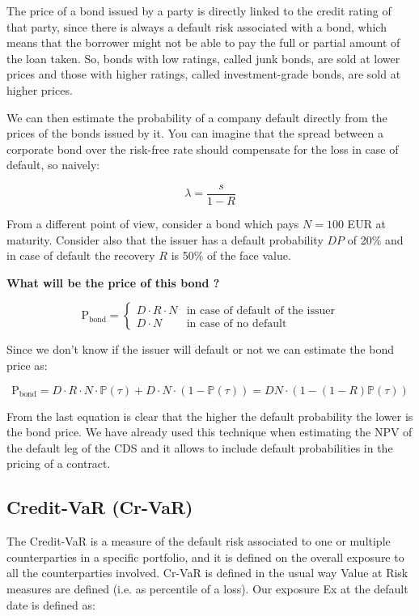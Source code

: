 The price of a bond issued by a party is directly linked to the credit
rating of that party, since there is always a default risk associated
with a bond, which means that the borrower might not be able to pay the
full or partial amount of the loan taken. So, bonds with low ratings,
called junk bonds, are sold at lower prices and those with higher
ratings, called investment-grade bonds, are sold at higher prices.

We can then estimate the probability of a company default directly from
the prices of the bonds issued by it. You can imagine that the spread
between a corporate bond over the risk-free rate should compensate for
the loss in case of default, so naively:

\[\lambda = \frac{s}{1-R}\]

From a different point of view, consider a bond which pays \(N=100\) EUR
at maturity. Consider also that the issuer has a default probability
\(DP\) of 20\% and in case of default the recovery \(R\) is 50\% of the
face value.

\textbf{What will be the price of this bond ?}

\[\textrm{P}_{\textrm{bond}} = 
\begin{cases}
D\cdot R \cdot N & \text{in case of default of the issuer}\\
D\cdot N & \text{in case of no default} 
\end{cases}
\]

Since we don't know if the issuer will default or not we can estimate
the bond price as:

\[ \textrm{P}_{\textrm{bond}} = D\cdot R \cdot N \cdot \mathbb{P}(\tau) + D\cdot N \cdot (1 - \mathbb{P}(\tau)) = DN\cdot ( 1 - (1-R)\mathbb{P}(\tau))\]

From the last equation is clear that the higher the default probability
the lower is the bond price. We have already used this technique when
estimating the NPV of the default leg of the CDS and it allows to
include default probabilities in the pricing of a contract.

    \subsection{Credit-VaR (Cr-VaR)}\label{credit-var-cr-var}

The Credit-VaR is a measure of the default risk associated to one or
multiple counterparties in a specific portfolio, and it is defined on
the overall exposure to all the counterparties involved. Cr-VaR is
defined in the usual way Value at Risk measures are defined (i.e. as
percentile of a loss). Our exposure Ex at the default date is defined
as:

